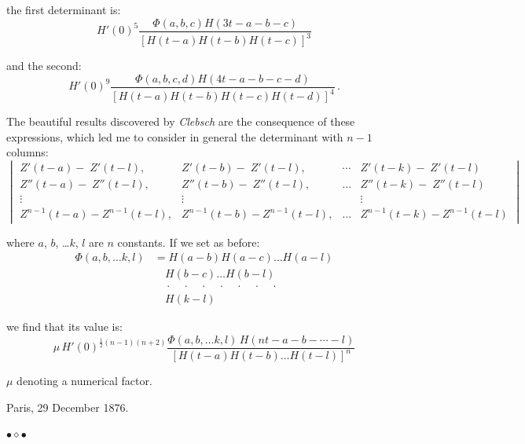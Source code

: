 \documentclass[12pt]{article}
\begin{document}
\noindent the first determinant is:
\begin{equation*}
H'(0)^5 \frac{\Phi(a,b,c)H(3t-a-b-c)}{[H(t-a)H(t-b)H(t-c)]^3}
\end{equation*}

\noindent and the second:
\begin{equation*}
H'(0)^9 \frac{\Phi(a,b,c,d)H(4t-a-b-c-d)}{[H(t-a)H(t-b)H(t-c)H(t-d)]^4}\,.
\end{equation*}

\noindent The beautiful results discovered by \textit{Clebsch} are the consequence of these expressions, which led me to consider in general the determinant with $n-1$ columns:
\begin{equation*}
\begin{vmatrix}
Z'(t-a)-\; Z'(t-l), & Z'(t-b)-\; Z'(t-l), & \cdots & Z'(t-k)-\; Z'(t-l) \\
Z''(t-a)-\; Z''(t-l), & Z''(t-b)-\; Z''(t-l), & \ldots & Z''(t-k)-\; Z''(t-l) \\
\vdots & \vdots & & \vdots \\
Z^{n-1}(t-a)-Z^{n-1}(t-l), & Z^{n-1}(t-b)-Z^{n-1}(t-l), & \ldots & Z^{n-1}(t-k)-Z^{n-1}(t-l)
\end{vmatrix}
\end{equation*}


\noindent where $a$, $b$, \ldots $k$, $l$ are $n$ constants. If we set as before:
\begin{align*}
\Phi(a,b,\ldots k, l) &= H(a-b)H(a-c)\ldots H(a-l)\\
&\quad H(b-c)\ldots H(b-l)\\
&\quad \cdot\quad\cdot\quad\cdot\quad\cdot\quad\cdot\quad\cdot\quad\cdot\\
&\quad H(k-l)
\end{align*}

\noindent we find that its value is:
\begin{equation*}
\mu\, H'(0)^{\frac{1}{2}(n-1)(n+2)} \frac{\Phi(a,b,\ldots k,l)\,H(nt-a-b-\cdots-l)}{[H(t-a)H(t-b)\ldots H(t-l)]^n}
\end{equation*}

\noindent $\mu$ denoting a numerical factor.

Paris, 29 December 1876.


\vspace{1in}
\begin{center}
\raisebox{0.5ex}{\rule{1in}{0.5pt}}\quad$\bullet$\quad$\diamond$\quad$\bullet$\quad\raisebox{0.5ex}{\rule{1in}{0.5pt}}
\end{center}
\end{document}
